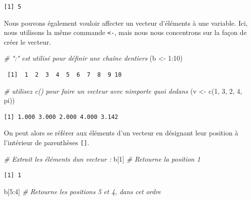 \documentclass[
  12pt,
]{book}
\newenvironment{Shaded}{\begin{snugshade}}{\end{snugshade}}
\newcommand{\CommentTok}[1]{\textcolor[rgb]{0.56,0.35,0.01}{\textit{#1}}}
\newcommand{\DecValTok}[1]{\textcolor[rgb]{0.00,0.00,0.81}{#1}}
\newcommand{\FunctionTok}[1]{\textcolor[rgb]{0.00,0.00,0.00}{#1}}
\newcommand{\NormalTok}[1]{#1}
\newcommand{\OtherTok}[1]{\textcolor[rgb]{0.56,0.35,0.01}{#1}}
\newcommand{\SpecialCharTok}[1]{\textcolor[rgb]{0.00,0.00,0.00}{#1}}
\begin{document}
\begin{verbatim}
[1] 5
\end{verbatim}

Nous pouvons également vouloir affecter un vecteur d'éléments à une variable. Ici, nous utilisons la même commande \texttt{\textless{}-}, mais nous nous concentrons sur la façon de créer le vecteur.

\begin{Shaded}
\begin{Highlighting}[]
\CommentTok{\# ":"  est utilisé pour définir une chaîne d\textquotesingle{}entiers}
\NormalTok{(b }\OtherTok{\textless{}{-}} \DecValTok{1}\SpecialCharTok{:}\DecValTok{10}\NormalTok{)}
\end{Highlighting}
\end{Shaded}

\begin{verbatim}
 [1]  1  2  3  4  5  6  7  8  9 10
\end{verbatim}

\begin{Shaded}
\begin{Highlighting}[]
\CommentTok{\# utilisez c() pour faire un vecteur avec n\textquotesingle{}importe quoi dedans}
\NormalTok{(v }\OtherTok{\textless{}{-}} \FunctionTok{c}\NormalTok{(}\DecValTok{1}\NormalTok{, }\DecValTok{3}\NormalTok{, }\DecValTok{2}\NormalTok{, }\DecValTok{4}\NormalTok{, pi))}
\end{Highlighting}
\end{Shaded}

\begin{verbatim}
[1] 1.000 3.000 2.000 4.000 3.142
\end{verbatim}

On peut alors se référer aux éléments d'un vecteur en désignant leur position à l'intérieur de parenthèses \texttt{{[}{]}}.

\begin{Shaded}
\begin{Highlighting}[]
\CommentTok{\# Extrait les éléments d\textquotesingle{}un vecteur :}
\NormalTok{b[}\DecValTok{1}\NormalTok{] }\CommentTok{\# Retourne la position 1}
\end{Highlighting}
\end{Shaded}

\begin{verbatim}
[1] 1
\end{verbatim}

\begin{Shaded}
\begin{Highlighting}[]
\NormalTok{b[}\DecValTok{5}\SpecialCharTok{:}\DecValTok{4}\NormalTok{] }\CommentTok{\# Retourne les positions 5 et 4, dans cet ordre}
\end{Highlighting}
\end{Shaded}
\end{document}
